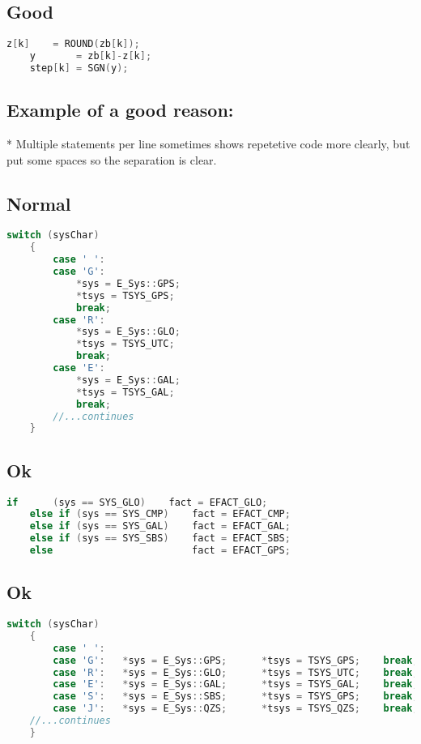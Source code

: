 \subsection{Good}

\begin{lstlisting}[language=c++]
    z[k]    = ROUND(zb[k]);
    y       = zb[k]-z[k]; 
    step[k] = SGN(y);
\end{lstlisting}

\subsection{Example of a good reason:}

* Multiple statements per line sometimes shows repetetive code more clearly, but put some spaces so the separation is clear.

\subsection{Normal}

\begin{lstlisting}[language=c++]
    switch (sysChar)
    {
        case ' ':
        case 'G': 
            *sys = E_Sys::GPS; 
            *tsys = TSYS_GPS; 
            break;
        case 'R': 
            *sys = E_Sys::GLO;  
            *tsys = TSYS_UTC; 
            break;
        case 'E': 
            *sys = E_Sys::GAL;  
            *tsys = TSYS_GAL; 
            break;
        //...continues
    }
\end{lstlisting}

\subsection{Ok}

\begin{lstlisting}[language=c++]
    if      (sys == SYS_GLO)    fact = EFACT_GLO;
	else if (sys == SYS_CMP)    fact = EFACT_CMP;
	else if (sys == SYS_GAL)    fact = EFACT_GAL;
	else if (sys == SYS_SBS)    fact = EFACT_SBS;
	else                        fact = EFACT_GPS;
\end{lstlisting}

\subsection{Ok}	

\begin{lstlisting}[language=c++]
    switch (sysChar)
    {
        case ' ':
        case 'G':   *sys = E_Sys::GPS;      *tsys = TSYS_GPS;    break;
        case 'R':   *sys = E_Sys::GLO;      *tsys = TSYS_UTC;    break;
        case 'E':   *sys = E_Sys::GAL;      *tsys = TSYS_GAL;    break;
        case 'S':   *sys = E_Sys::SBS;      *tsys = TSYS_GPS;    break;
        case 'J':   *sys = E_Sys::QZS;      *tsys = TSYS_QZS;    break;
    //...continues
    }
\end{lstlisting}

